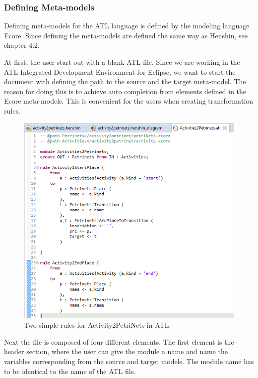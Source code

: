\subsubsection*{Defining Meta-models}

Defining meta-models for the ATL language is defined by the modeling language
Ecore. Since defining the meta-models are defined the same way as Henshin, see
chapter 4.2.

At first, the user start out with a blank ATL file. Since we are working in
the ATL Integrated Development Environment for Eclipse, we want to start the
document with defining the path to the source and the target meta-model. The
reason for doing this is to achieve auto completion from elements defined in the
Ecore meta-models. This is convenient for the users when creating transformation
rules.  

\begin{figure}[H]
	\centering
	\includegraphics[scale=0.5]{figures/ATLScreen.png}
	\caption[Simple rules for ATL]
	{Two simple rules for Activity2PetriNets in ATL.}
	\label{fig:ATL_Screen}
\end{figure}

Next the file is composed of four different elements. The first element is the
header section, where the user can give the module a name and name the variables
corresponding from the source and target models. The module name has to be
identical to the name of the ATL file.

